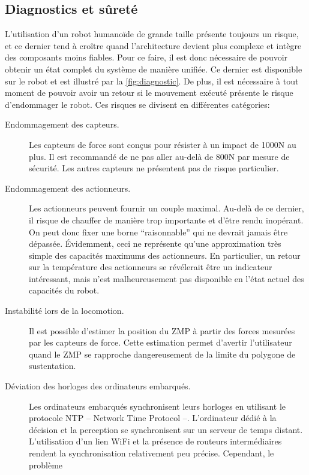 \subsection{Diagnostics et sûreté}

L'utilisation d'un robot humanoïde de grande taille présente toujours
un risque, et ce dernier tend à croître quand l'architecture devient
plus complexe et intègre des composants moins fiables. Pour ce faire,
il est donc nécessaire de pouvoir obtenir un état complet du système
de manière unifiée. Ce dernier est disponible sur le robot et est
illustré par la \autoref{fig:diagnostic}. De plus, il est nécessaire à
tout moment de pouvoir avoir un retour si le mouvement exécuté
présente le risque d'endommager le robot. Ces risques se divisent en
différentes catégories:
\begin{description}
\item[Endommagement des capteurs.] Les capteurs de force sont conçus
  pour résister à un impact de 1000N au plus. Il est recommandé de ne
  pas aller au-delà de 800N par mesure de sécurité. Les autres
  capteurs ne présentent pas de risque particulier.
\item[Endommagement des actionneurs.] Les actionneurs peuvent fournir
  un couple maximal. Au-delà de ce dernier, il risque de chauffer de
  manière trop importante et d'être rendu inopérant. On peut donc
  fixer une borne ``raisonnable'' qui ne devrait jamais être
  dépassée. Évidemment, ceci ne représente qu'une approximation très
  simple des capacités maximums des actionneurs. En particulier, un
  retour sur la température des actionneurs se révélerait être un
  indicateur intéressant, mais n'est malheureusement pas disponible en
  l'état actuel des capacités du robot.
\item[Instabilité lors de la locomotion.] Il est possible d'estimer la
  position du ZMP à partir des forces
  mesurées par les capteurs de force. Cette estimation permet
  d'avertir l'utilisateur quand le ZMP se rapproche dangereusement de
  la limite du polygone de sustentation.
\item[Déviation des horloges des ordinateurs embarqués.] Les
  ordinateurs embarqués synchronisent leurs horloges en utilisant le
  protocole NTP -- Network Time Protocol --. L'ordinateur dédié à la décision et la perception
  se synchronisent sur un serveur de temps distant. L'utilisation d'un
  lien WiFi et la présence de routeurs intermédiaires rendent la
  synchronisation relativement peu précise. Cependant, le problème

\end{description}
